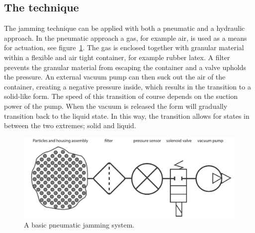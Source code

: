 

\subsection{The technique}
\label{ch:jamming:technique}

The jamming technique can be applied with both a pneumatic and a hydraulic approach.
In the pneumatic approach a gas, for example air, is used as a means for actuation, see figure~\ref{fig:ch:jamming:jamming-basics}.
The gas is enclosed together with granular material within a flexible and air tight container, for example rubber latex. 
A filter prevents the granular material from escaping the container and a valve upholds the pressure.
An external vacuum pump can then suck out the air of the container, creating a negative pressure inside, which results in the transition to a solid-like form. 
The speed of this transition of course depends on the suction power of the pump.
When the vacuum is released the form will gradually transition back to the liquid state. 
In this way, the transition allows for states in between the two extremes; solid and liquid.

\begin{figure}[h]
  \centering
      \includegraphics[width=.9\textwidth]{figures/jamming/jamming-basics}
	\caption{A basic pneumatic jamming system.}
   \label{fig:ch:jamming:jamming-basics}
\end{figure}

